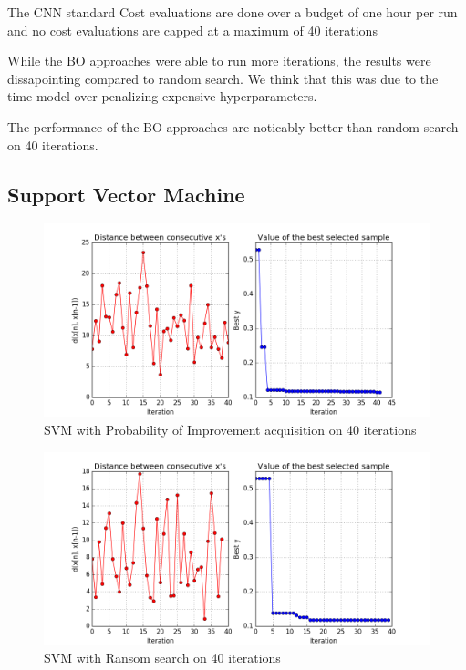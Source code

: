 \documentclass[letterpaper]{article}
\begin{document}
The CNN standard Cost evaluations are done over a budget of one hour per run and no cost evaluations are capped at a maximum of 40 iterations

While the BO approaches were able to run more iterations, the results were dissapointing compared to random search.
We think that this was due to the time model over penalizing expensive hyperparameters.

The performance of the BO approaches are noticably better than random search on 40 iterations.

\subsection {Support Vector Machine}
\begin{figure}[h]
	\includegraphics[width=\linewidth]{EIX_SVM_X_init2_NC_ITER40.png}
	\caption{SVM with Probability of Improvement acquisition on 40 iterations}
\end{figure}
\begin{figure}[h]
	\includegraphics[width=\linewidth]{RAND_SVM_X_init2_NC_ITER40.png}
	\caption{SVM with Ransom search on 40 iterations}
\end{figure}
\end{document}

